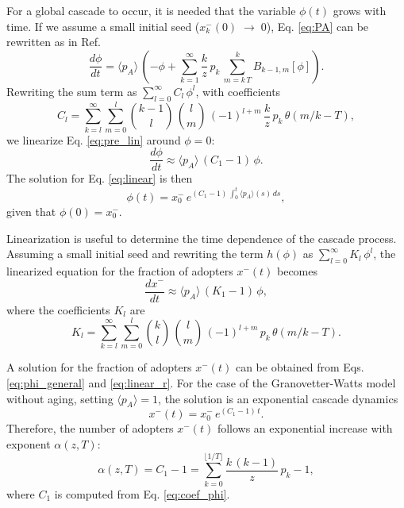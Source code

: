 For a global cascade to occur, it is needed that the variable $\phi(t)$ grows with time. If we assume a small initial seed ($x^{-}_{k} (0) \; \to \; 0$), Eq. \eqref{eq:PA} can be rewritten as in Ref. \cite{gleeson-2007}
\begin{equation}
    \label{eq:pre_lin}
    \frac{d \phi}{dt}  = \langle p_A \rangle \, \left( -\phi + \sum_{k=1}^{\infty} \frac{k}{z} \, p_k \, \sum_{m = k\, T}^{k} B_{k-1,m} [\phi] \right).
\end{equation}
Rewriting the sum term as $\sum_{l=0}^{\infty} C_l \, \phi^l$, with coefficients 
\begin{equation}
    \label{eq:coef_phi}
    C_l = \sum_{k=l}^{\infty} \sum_{m=0}^{l} { k-1 \choose l} \, {l \choose m} \, (-1)^{l+m} \, \frac{k}{z} \, p_k \, \theta\left(m/k - T \right),
\end{equation}
we linearize Eq. \eqref{eq:pre_lin} around $\phi = 0$:
\begin{equation}
    \label{eq:linear}
    \frac{d \phi}{dt} \approx  \langle p_A \rangle \, ( C_1 -1) \, \phi.
\end{equation}
The solution for Eq. \eqref{eq:linear} is then
\begin{equation}
    \label{eq:phi_general}
    \phi(t) = x^{-}_{0}\,  e^{(C_1 - 1) \, \int_0^t \langle p_A \rangle (s) \, ds},
\end{equation}
given that $ \phi(0) = x^{-}_{0}$.

Linearization is useful to determine the time dependence of the cascade process.  Assuming a small initial seed and rewriting the term $h(\phi)$ as  $ \sum_{l=0}^{\infty} K_l\,  \phi^l $, the linearized equation for the fraction of adopters $x^{-}(t)$ becomes
\begin{equation}
    \label{eq:linear_r}
    \frac{d x^{-}}{dt} \approx  \langle p_A \rangle\,  ( K_1 -1)\, \phi,
\end{equation}
where the coefficients $K_l$ are
\begin{equation}
    \label{eq:coef_rho}
    K_l = \sum_{k=l}^{\infty} \sum_{m=0}^{l} { k \choose l} \, {l \choose m} \, (-1)^{l+m}\,  p_k \, \theta\left( m/k - T \right).
\end{equation}

A solution for the fraction of adopters $x^{-}(t)$ can be obtained from  Eqs. \eqref{eq:phi_general} and \eqref{eq:linear_r}.  For the case of the Granovetter-Watts model without aging, setting $\langle p_A \rangle = 1$,  the solution is an exponential cascade dynamics
\begin{equation}
    x^{-}(t) = x^{-}_{0} \, e^{(C_1 - 1)\, t}.
\end{equation}
Therefore, the number of adopters $x^{-} (t)$ follows an exponential increase with exponent $\alpha(z,T)$:
\begin{equation}
    \label{eq:alpha}
    \alpha(z,T) = C_1 - 1 = \sum_{k=0}^{\lfloor 1/T \rfloor} \frac{k \, (k - 1)}{z}\, p_k - 1,
\end{equation}
where $C_1$ is computed from Eq. \eqref{eq:coef_phi}. 

